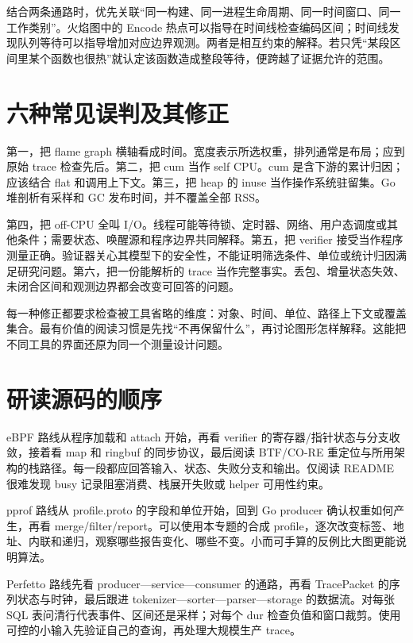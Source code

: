 \documentclass[UTF8,fontset=fandol,openany,11pt]{ctexbook}
\begin{document}
结合两条通路时，优先关联“同一构建、同一进程生命周期、同一时间窗口、同一工作类别”。火焰图中的 Encode 热点可以指导在时间线检查编码区间；时间线发现队列等待可以指导增加对应边界观测。两者是相互约束的解释。若只凭“某段区间里某个函数也很热”就认定该函数造成整段等待，便跨越了证据允许的范围。


\section{六种常见误判及其修正}

第一，把 flame graph 横轴看成时间。宽度表示所选权重，排列通常是布局；应到原始 trace 检查先后。第二，把 cum 当作 self CPU。cum 是含下游的累计归因；应该结合 flat 和调用上下文。第三，把 heap 的 inuse 当作操作系统驻留集。Go 堆剖析有采样和 GC 发布时间，并不覆盖全部 RSS。\cite{pp-flame}\cite{pp-graph}\cite{pp-mprof}


第四，把 off-CPU 全叫 I/O。线程可能等待锁、定时器、网络、用户态调度或其他条件；需要状态、唤醒源和程序边界共同解释。第五，把 verifier 接受当作程序测量正确。验证器关心其模型下的安全性，不能证明筛选条件、单位或统计归因满足研究问题。第六，把一份能解析的 trace 当作完整事实。丢包、增量状态失效、未闭合区间和观测边界都会改变可回答的问题。


每一种修正都要求检查被工具省略的维度：对象、时间、单位、路径上下文或覆盖集合。最有价值的阅读习惯是先找“不再保留什么”，再讨论图形怎样解释。这能把不同工具的界面还原为同一个测量设计问题。


\section{研读源码的顺序}

eBPF 路线从程序加载和 attach 开始，再看 verifier 的寄存器/指针状态与分支收敛，接着看 map 和 ringbuf 的同步协议，最后阅读 BTF/CO-RE 重定位与所用架构的栈路径。每一段都应回答输入、状态、失败分支和输出。仅阅读 README 很难发现 busy 记录阻塞消费、栈展开失败或 helper 可用性约束。


pprof 路线从 profile.proto 的字段和单位开始，回到 Go producer 确认权重如何产生，再看 merge/filter/report。可以使用本专题的合成 profile，逐次改变标签、地址、内联和递归，观察哪些报告变化、哪些不变。小而可手算的反例比大图更能说明算法。\cite{pp-proto}\cite{pp-merge}\cite{pp-filter}\cite{pp-total}


Perfetto 路线先看 producer—service—consumer 的通路，再看 TracePacket 的序列状态与时钟，最后跟进 tokenizer—sorter—parser—storage 的数据流。对每张 SQL 表问清行代表事件、区间还是采样；对每个 dur 检查负值和窗口裁剪。使用可控的小输入先验证自己的查询，再处理大规模生产 trace。
\end{document}
